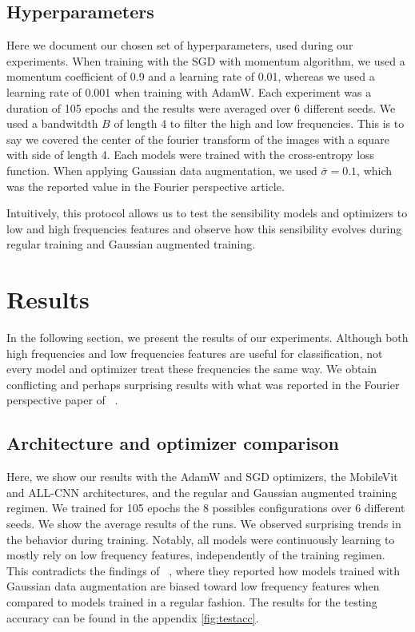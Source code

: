\documentclass{article} \author{Simon Théorêt}
\begin{document}
\subsection*{Hyperparameters}
Here we document our chosen set of hyperparameters, used during our
experiments. When training with the SGD with momentum algorithm, we
used a momentum coefficient of 0.9 and a learning rate of 0.01,
whereas we used a learning rate of 0.001 when training with
AdamW. Each experiment was a duration of 105 epochs and the results
were averaged over 6 different seeds. We used a bandwitdth $B$ of
length 4 to filter the high and low frequencies. This is to say we
covered the center of the fourier transform of the images with a
square with side of length 4. Each models were trained with the
cross-entropy loss function. When applying Gaussian data augmentation,
we used $\bar{\sigma} = 0.1$, which was the reported value in the
Fourier perspective article.

Intuitively, this protocol allows us to test the sensibility models
and optimizers to low and high frequencies features and observe how
this sensibility evolves during regular training and Gaussian
augmented training.

\section{Results}
In the following section, we present the results of our
experiments. Although both high frequencies and low frequencies
features are useful for classification, not every model and optimizer
treat these frequencies the same way. We obtain conflicting and
perhaps surprising results with what was reported in the Fourier
perspective paper of ~\citep{yin2020fourier}.

\subsection{Architecture and optimizer comparison}
Here, we show our results with the AdamW and SGD optimizers, the
MobileVit and ALL-CNN architectures, and the regular and Gaussian
augmented training regimen.  We trained for 105 epochs the 8 possibles
configurations over 6 different seeds. We show the average results of
the runs.  We observed surprising trends in the behavior during
training. Notably, all models were continuously learning to mostly
rely on low frequency features, independently of the training
regimen. This contradicts the findings of ~\citep{yin2020fourier},
where they reported how models trained with Gaussian data augmentation
are biased toward low frequency features when compared to models
trained in a regular fashion. The results for the testing accuracy can
be found in the appendix \ref{fig:testacc}.
\end{document}
